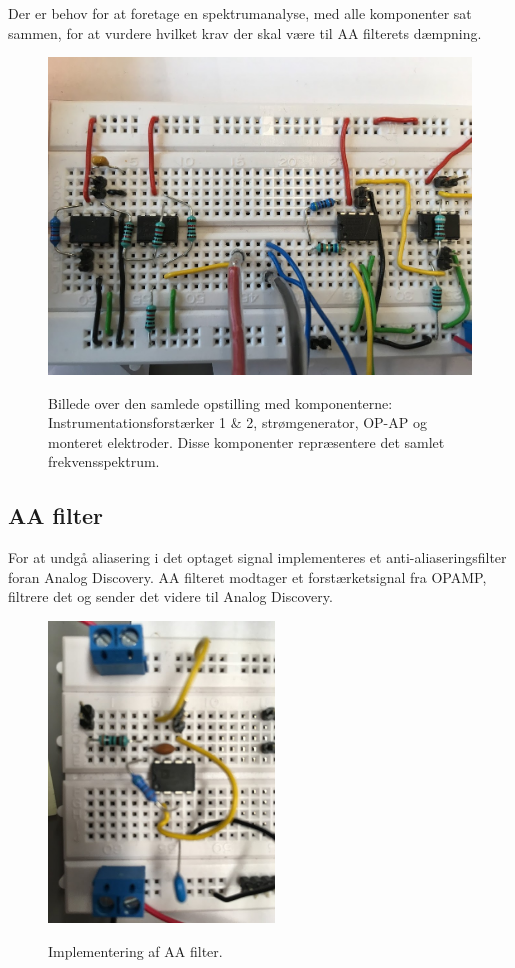 Der er behov for at foretage en spektrumanalyse, med alle komponenter sat sammen, for at vurdere hvilket krav der skal være til AA filterets dæmpning.  



\begin{figure}[H] 
\centering
{\includegraphics[width=\linewidth]
{Figure/aaspectrumimplementering}}
\caption{Billede over den samlede opstilling med komponenterne: Instrumentationsforstærker 1 \& 2, strømgenerator, OP-AP og monteret elektroder. Disse komponenter repræsentere det samlet frekvensspektrum.}
\label{aaspectrumimplementering}
\end{figure}

\subsection{AA filter}

For at undgå aliasering i det optaget signal implementeres et anti-aliaseringsfilter foran Analog Discovery. AA filteret modtager et forstærketsignal fra OPAMP, filtrere det og sender det videre til Analog Discovery.    

\begin{figure}[H] 
\centering
{\includegraphics[width=6cm]
{Figure/aafilterimplementering}}
\caption{Implementering af AA filter.}
\label{aafilterimplementering}
\end{figure}





